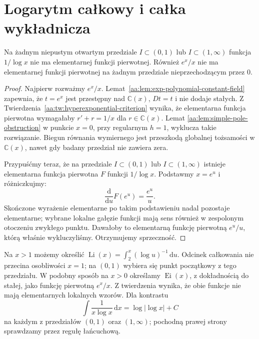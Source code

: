 \section{Logarytm całkowy i całka wykładnicza}

\begin{twierdzenie}
\label{aa:tw:logarithmic-integral-nonelementary}
Na żadnym niepustym otwartym przedziale
$I\subset(0,1)$ lub $I\subset(1,\infty)$
funkcja $1/\log x$ nie ma elementarnej
funkcji pierwotnej. Również $e^x/x$
nie ma elementarnej funkcji pierwotnej
na żadnym przedziale nieprzechodzącym
przez $0$.
\end{twierdzenie}
\begin{proof}
Najpierw rozważmy $e^x/x$.
Lemat~\ref{aa:lem:exp-polynomial-constant-field}
zapewnia, że $t=e^x$ jest
przestępny nad $\mathbb C(x)$,
$Dt=t$ i nie dodaje stałych.
Z Twierdzenia~\ref{aa:tw:hyperexponential-criterion}
wynika, że elementarna funkcja pierwotna
wymagałaby $r'+r=1/x$ dla
$r\in\mathbb C(x)$. Lemat
\ref{aa:lem:simple-pole-obstruction}
w punkcie $x=0$, przy regularnym $h=1$,
wyklucza takie rozwiązanie.
Biegun równania wymiernego jest przeszkodą
globalnej tożsamości w $\mathbb C(x)$,
nawet gdy badany przedział nie zawiera zera.

Przypuśćmy teraz, że na przedziale
$I\subset(0,1)$ lub $I\subset(1,\infty)$
istnieje elementarna funkcja pierwotna
$F$ funkcji $1/\log x$.
Podstawmy $x=e^u$ i różniczkujmy:
\[
 \frac{\mathrm d}{\mathrm du}F(e^u)
 =\frac{e^u}{u}.
\]
Skończone wyrażenie elementarne
po takim podstawieniu nadal pozostaje
elementarne; wybrane lokalne gałęzie
funkcji mają sens również w zespolonym
otoczeniu zwykłego punktu.
Dawałoby to elementarną funkcję
pierwotną $e^u/u$, którą właśnie
wykluczyliśmy. Otrzymujemy sprzeczność.
\end{proof}

\begin{przyklad}
\label{aa:prz:li-ei-definitions}
Na $x>1$ możemy określić
$\operatorname{Li}(x)=
\int_2^x(\log u)^{-1}\,\mathrm du$.
Odcinek całkowania nie przecina osobliwości
$x=1$; na $(0,1)$ wybiera się punkt
początkowy z tego przedziału.
W podobny sposób na $x>0$ określamy
$\operatorname{Ei}(x)$, z dokładnością
do stałej, jako funkcję pierwotną $e^x/x$.
Z twierdzenia wynika, że obie funkcje
nie mają elementarnych lokalnych wzorów.
Dla kontrastu
\[
 \int\frac1{x\log x}\,\mathrm dx
 =\log|\log x|+C
\]
na każdym z przedziałów $(0,1)$
oraz $(1,\infty)$; pochodną prawej
strony sprawdzamy przez regułę łańcuchową.
\end{przyklad}

